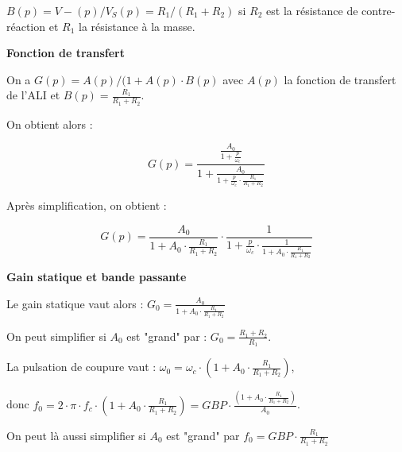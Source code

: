 \documentclass[a4paper,french]{paper}
\begin{document}
		$B(p) = V-(p) / V_S(p) = R_1 / (R_1 + R_2)$ si $R_2$ est la résistance de contre-réaction et $R_1$ la résistance à la masse.
		
\medskip 

\textbf{\large Fonction de transfert}

On a $G(p) = A(p) / (1 + A(p) \cdot B(p)$ avec $A(p)$ la fonction de transfert de l'ALI et $B(p) = \frac{R_1}{R_1 + R_2}$.
		
		On obtient alors : 
		
		$$G(p) = \frac{\frac{A_0}{1 + \frac{p}{\omega_c}}}{1 + \frac{A_0}{1 + \frac{p}{\omega_c} \cdot \frac{R_1}{R_1 + R_2}}}$$
		
		Après simplification, on obtient : 
		
		$$G(p) = \frac{A_0}{1 + A_0 \cdot \frac{R_1}{R_1 + R_2}} \cdot \frac{1}{1 + \frac{p}{\omega_c} \cdot \frac{1}{1 + A_0 \cdot \frac{R_1}{R_1 + R_2}}}$$


\textbf{\large Gain statique et bande passante}

Le gain statique vaut alors : $G_0 = \frac{A_0}{1 + A_0 \cdot \frac{R_1}{R_1 + R_2}}$
		
		On peut simplifier si $A_0$ est "grand" par : $G_0 = \frac{R_1 + R_2}{R_1}$.
		
		La pulsation de coupure vaut : $\omega_0 = \omega_c \cdot (1 + A_0 \cdot \frac{R_1}{R_1 + R_2})$, 
				
		donc $f_0 = 2 \cdot \pi \cdot f_c \cdot (1 + A_0 \cdot \frac{R_1}{R_1 + R_2}) = GBP \cdot \frac{(1 + A_0 \cdot \frac{R_1}{R_1 + R_2})}{A_0}$.
		
		On peut là aussi simplifier si $A_0$ est "grand" par $f_0 = GBP \cdot \frac{R_1}{R_1 + R_2}$
\end{document}
